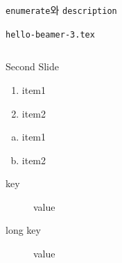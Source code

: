 \documentclass[compress]{beamer}
\begin{document}
\begin{frame}[fragile=singleslide]{\texttt{enumerate}와 \texttt{description}}
  \begin{block}{\texttt{hello-beamer-3.tex}}
    \begin{columns}
      \begin{column}{0.5\textwidth}
        \begin{latexcode}
          \begin{frame}{Second Slide}
            \begin{enumerate}
              \item item1
              \item item2
            \end{enumerate}
            \begin{enumerate}[(a)]
              \item item1
              \item item2
            \end{enumerate}
            \begin{description}
              \item[key] value
              \item[long key] value
            \end{description}
          \end{frame}
        \end{latexcode}
      \end{column}
    \end{columns}
  \end{block}
\end{frame}
\end{document}
